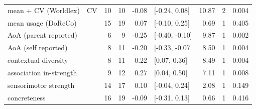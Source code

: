 \begin{table}[ht]
\begin{tabular}{llrrrlrrl}
  mean + CV (Worldlex) & CV & 10 & 10 & -0.08 & [-0.24, 0.08] & 10.87 & 2 & 0.004 \\ 
  mean usage (DoReCo) &  & 15 & 19 & 0.07 & [-0.10, 0.25] & 0.69 & 1 & 0.405 \\ 
  AoA (parent reported) &  & 6 & 9 & -0.25 & [-0.40, -0.10] & 9.87 & 1 & 0.002 \\ 
  AoA (self reported) &  & 8 & 11 & -0.20 & [-0.33, -0.07] & 8.50 & 1 & 0.004 \\ 
  contextual diversity &  & 8 & 11 & 0.22 & [0.07, 0.36] & 8.49 & 1 & 0.004 \\ 
  association in-strength &  & 9 & 12 & 0.27 & [0.04, 0.50] & 7.11 & 1 & 0.008 \\ 
  sensorimotor strength &  & 14 & 17 & 0.10 & [-0.04, 0.24] & 2.08 & 1 & 0.149 \\ 
  concreteness &  & 16 & 19 & -0.09 & [-0.31, 0.13] & 0.66 & 1 & 0.416 \\ 
   \hline
\end{tabular}
\end{table}
